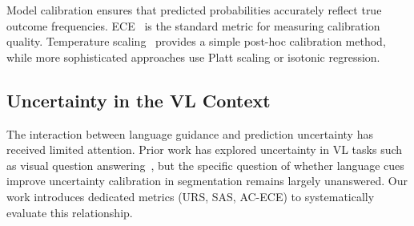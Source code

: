 Model calibration ensures that predicted probabilities accurately reflect true outcome frequencies. \ac{ECE}~\cite{naeini2015obtaining} is the standard metric for measuring calibration quality. Temperature scaling~\cite{guo2017calibration} provides a simple post-hoc calibration method, while more sophisticated approaches use Platt scaling or isotonic regression.

\subsection{Uncertainty in the VL Context}
\label{sec:rw:vluncertainty}

The interaction between language guidance and prediction uncertainty has received limited attention. Prior work has explored uncertainty in VL tasks such as visual question answering~\cite{whitehead2022reliable}, but the specific question of whether language cues improve uncertainty calibration in segmentation remains largely unanswered. Our work introduces dedicated metrics (\ac{URS}, \ac{SAS}, \ac{AC-ECE}) to systematically evaluate this relationship.
